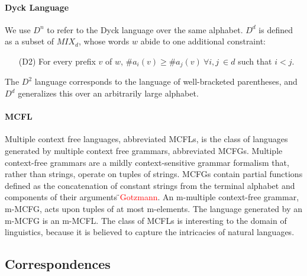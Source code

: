 \documentclass[nonatbib,numbers,10pt]{sigplanconf}
\newcommand\todo[1]{\textcolor{red}{#1}}
\begin{document}
\paragraph{Dyck Language}
We use $D^n$ to refer to the Dyck language over the same alphabet. $D^d$ is defined as a subset of $MIX_d$, whose words $w$ abide to one additional constraint:
\begin{itemize}
\item[(D2)] For every prefix $v$ of $w$, $ \#a_i(v) \geq \#a_j(v) \ \forall i, j \ \in d$ such that $i < j$.
\end{itemize}

The $D^2$ language corresponds to the language of well-bracketed parentheses, and $D^d$ generalizes this over an arbitrarily large alphabet.
\paragraph{MCFL}
Multiple context free languages, abbreviated MCFLs, is the class of languages generated by multiple context free grammars, abbreviated MCFGs. Multiple context-free grammars are a mildly context-sensitive grammar formalism that, rather than strings, operate on tuples of strings. MCFGs contain partial functions defined as the concatenation of constant strings from the terminal alphabet and components of their arguments \todo{̈Gotzmann}. An m-multiple context-free grammar, m-MCFG, acts upon tuples of at most m-elements. The language generated by an m-MCFG is an m-MCFL. The class of MCFLs is interesting to the domain of linguistics, because it is believed to capture the intricacies of natural languages. 

\subsection{Correspondences}
%
\end{document}
